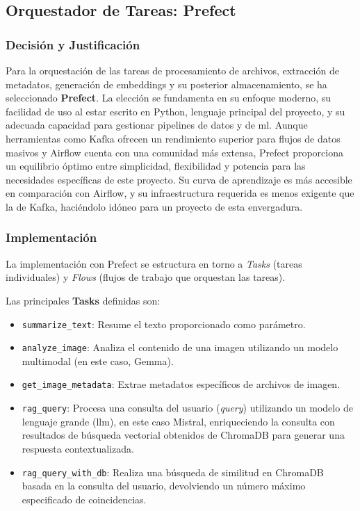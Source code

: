 \subsection{Orquestador de Tareas: Prefect}
\label{subsec:decision_prefect}
\subsubsection{Decisión y Justificación}
Para la orquestación de las tareas de procesamiento de archivos, extracción de metadatos, generación de embeddings y su posterior almacenamiento, se ha seleccionado \textbf{Prefect}. La elección se fundamenta en su enfoque moderno, su facilidad de uso al estar escrito en Python, lenguaje principal del proyecto, y su adecuada capacidad para gestionar pipelines de datos y de \gls{ml}. Aunque herramientas como Kafka ofrecen un rendimiento superior para flujos de datos masivos y Airflow cuenta con una comunidad más extensa, Prefect proporciona un equilibrio óptimo entre simplicidad, flexibilidad y potencia para las necesidades específicas de este proyecto. Su curva de aprendizaje es más accesible en comparación con Airflow, y su infraestructura requerida es menos exigente que la de Kafka, haciéndolo idóneo para un proyecto de esta envergadura.

\subsubsection{Implementación}
La implementación con Prefect se estructura en torno a \textit{Tasks} (tareas individuales) y \textit{Flows} (flujos de trabajo que orquestan las tareas).

Las principales \textbf{Tasks} definidas son:
\begin{itemize}
    \item \texttt{summarize\_text}: Resume el texto proporcionado como parámetro.
    \item \texttt{analyze\_image}: Analiza el contenido de una imagen utilizando un modelo multimodal (en este caso, Gemma).
    \item \texttt{get\_image\_metadata}: Extrae metadatos específicos de archivos de imagen.
    \item \texttt{rag\_query}: Procesa una consulta del usuario (\textit{query}) utilizando un modelo de lenguaje grande (\gls{llm}), en este caso Mistral, enriqueciendo la consulta con resultados de búsqueda vectorial obtenidos de ChromaDB para generar una respuesta contextualizada.
    \item \texttt{rag\_query\_with\_db}: Realiza una búsqueda de similitud en ChromaDB basada en la consulta del usuario, devolviendo un número máximo especificado de coincidencias.
\end{itemize}

